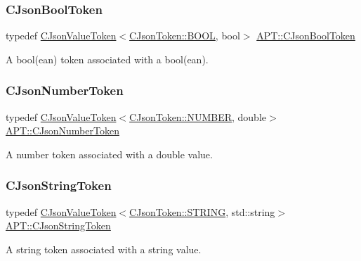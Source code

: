 \subsubsection{\texorpdfstring{C\+Json\+Bool\+Token}{CJsonBoolToken}}
{\footnotesize\ttfamily typedef \hyperlink{classAPT_1_1CJsonValueToken}{C\+Json\+Value\+Token}$<$\hyperlink{classAPT_1_1CJsonToken_aab8edca6cac7d6c2cd4cb37ea0ab0dceabee35e13f6e1392c313da66ffe95564e}{C\+Json\+Token\+::\+B\+O\+OL}, bool$>$ \hyperlink{namespaceAPT_a6f531ac7001387df5b08e93d8f586000}{A\+P\+T\+::\+C\+Json\+Bool\+Token}}

A bool(ean) token associated with a bool(ean). \mbox{\label{namespaceAPT_aacc16da16d083aefa789bc0198b3effd}} 
\subsubsection{\texorpdfstring{C\+Json\+Number\+Token}{CJsonNumberToken}}
{\footnotesize\ttfamily typedef \hyperlink{classAPT_1_1CJsonValueToken}{C\+Json\+Value\+Token}$<$\hyperlink{classAPT_1_1CJsonToken_aab8edca6cac7d6c2cd4cb37ea0ab0dcea3113bd34020b4bff6e98c04ebc59cf1f}{C\+Json\+Token\+::\+N\+U\+M\+B\+ER}, double$>$ \hyperlink{namespaceAPT_aacc16da16d083aefa789bc0198b3effd}{A\+P\+T\+::\+C\+Json\+Number\+Token}}

A number token associated with a double value. \mbox{\label{namespaceAPT_a3af7abde9f907425ef65954a9b102083}} 
\subsubsection{\texorpdfstring{C\+Json\+String\+Token}{CJsonStringToken}}
{\footnotesize\ttfamily typedef \hyperlink{classAPT_1_1CJsonValueToken}{C\+Json\+Value\+Token}$<$\hyperlink{classAPT_1_1CJsonToken_aab8edca6cac7d6c2cd4cb37ea0ab0dceab38d27c8c3b0aa088ce14682895b19d0}{C\+Json\+Token\+::\+S\+T\+R\+I\+NG}, std\+::string$>$ \hyperlink{namespaceAPT_a3af7abde9f907425ef65954a9b102083}{A\+P\+T\+::\+C\+Json\+String\+Token}}

A string token associated with a string value. 